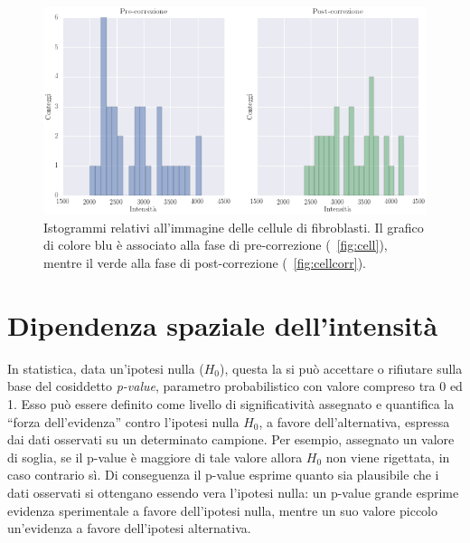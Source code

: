 \begin{figure}
 \centering
 \includegraphics[scale=.60]{img/CAP4isto3.png}
 \caption{\small{Istogrammi relativi all'immagine delle cellule di fibroblasti. Il grafico di colore blu è associato alla fase di pre-correzione (\figurename~\ref{fig:cell}), mentre il verde alla fase di post-correzione (\figurename~\ref{fig:cellcorr}).}}
 \label{fig:isto3}
\end{figure}


\section{Dipendenza spaziale dell'intensità}

In statistica, data un'ipotesi nulla ($H_0$), questa la si può accettare o rifiutare sulla base del cosiddetto \textit{p-value}, parametro probabilistico con valore compreso tra 0 ed 1.
Esso può essere definito come livello di significatività assegnato e quantifica la ``forza dell'evidenza'' contro l'ipotesi nulla $H_0$, a favore dell'alternativa, espressa dai dati osservati su un determinato campione. 
Per esempio, assegnato un valore di soglia, se il p-value è maggiore di tale valore allora $H_0$ non viene rigettata, in caso contrario sì.
Di conseguenza il p-value esprime quanto sia plausibile che i dati osservati si ottengano essendo vera l’ipotesi nulla: un p-value grande esprime evidenza sperimentale a favore dell'ipotesi nulla, mentre un suo valore piccolo un'evidenza a favore dell'ipotesi alternativa.

